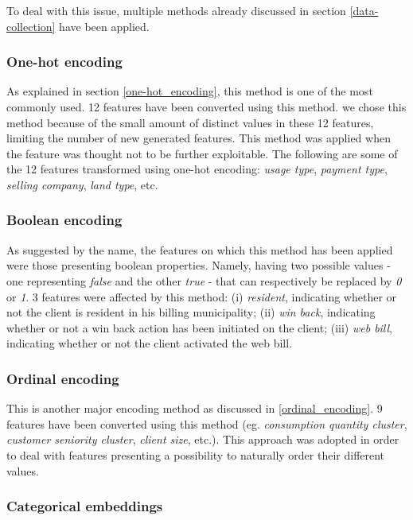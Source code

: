 \documentclass[LaM,binding=0.6cm, english]{sapthesis}
\begin{document}
To deal with this issue, multiple methods already discussed in section \ref{data-collection} have been applied.

\subsubsection{One-hot encoding}

As explained in section \ref{one-hot_encoding}, this method is one of the most commonly used. 12 features have been converted using this method. we chose this method because of the small amount of distinct values in these 12 features, limiting the number of new generated features. This method was applied when the feature was thought not to be further exploitable. The following are some of the 12 features transformed using one-hot encoding: \textit{usage type}, \textit{payment type}, \textit{selling company}, \textit{land type}, etc. 

\subsubsection{Boolean encoding}

As suggested by the name, the features on which this method has been applied were those presenting boolean properties. Namely, having two possible values - one representing \textit{false} and the other \textit{true} - that can respectively be replaced by \textit{0} or \textit{1}. 3 features were affected by this method: (i) \textit{resident}, indicating whether or not the client is resident in his billing municipality; (ii) \textit{win back}, indicating whether or not a win back action has been initiated on the client; (iii) \textit{web bill}, indicating whether or not the client activated the web bill.

\subsubsection{Ordinal encoding}

This is another major encoding method as discussed in \ref{ordinal_encoding}. 9 features have been converted using this method (eg. \textit{consumption quantity cluster}, \textit{customer seniority cluster}, \textit{client size}, etc.). This approach was adopted in order to deal with features presenting a possibility to naturally order their different values.

\subsubsection{Categorical embeddings}
\end{document}
